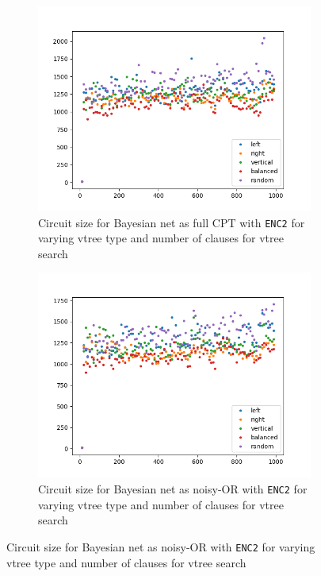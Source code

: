 \documentclass{article}
\begin{document}
\begin{figure}[h]
  \begin{subfigure}[b]{0.4\linewidth}
    \includegraphics[width=\linewidth]{images/enc2_full.png}
    \caption{Circuit size for Bayesian net as full CPT with \texttt{ENC2} for varying vtree type and number of clauses for vtree search}
  \end{subfigure}
    \begin{subfigure}[b]{0.4\linewidth}
    \includegraphics[width=\linewidth]{images/enc2_noisy.png}
    \caption{Circuit size for Bayesian net as noisy-OR with \texttt{ENC2} for varying vtree type and number of clauses for vtree search}
  \end{subfigure}
  \label{fig:circuits}
\end{figure}
\end{document}
